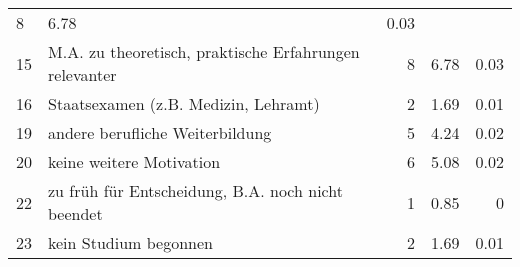 \begin{longtable}{lXrrr}
       \num{8} &
       \num[round-mode=places,round-precision=2]{6,78} &
         \num[round-mode=places,round-precision=2]{0,03} \\

     15 &
     \multicolumn{1}{X}{ M.A. zu theoretisch, praktische Erfahrungen relevanter   } &


       \num{8} &
       \num[round-mode=places,round-precision=2]{6,78} &
         \num[round-mode=places,round-precision=2]{0,03} \\

     16 &
     \multicolumn{1}{X}{ Staatsexamen (z.B. Medizin, Lehramt)   } &


       \num{2} &
       \num[round-mode=places,round-precision=2]{1,69} &
         \num[round-mode=places,round-precision=2]{0,01} \\

     19 &
     \multicolumn{1}{X}{ andere berufliche Weiterbildung   } &


       \num{5} &
       \num[round-mode=places,round-precision=2]{4,24} &
         \num[round-mode=places,round-precision=2]{0,02} \\

     20 &
     \multicolumn{1}{X}{ keine weitere Motivation   } &


       \num{6} &
       \num[round-mode=places,round-precision=2]{5,08} &
         \num[round-mode=places,round-precision=2]{0,02} \\

     22 &
     \multicolumn{1}{X}{ zu früh für Entscheidung, B.A. noch nicht beendet   } &


       \num{1} &
       \num[round-mode=places,round-precision=2]{0,85} &
         \num[round-mode=places,round-precision=2]{0} \\

     23 &
     \multicolumn{1}{X}{ kein Studium begonnen   } &


       \num{2} &
       \num[round-mode=places,round-precision=2]{1,69} &
         \num[round-mode=places,round-precision=2]{0,01} \\


\end{longtable}

